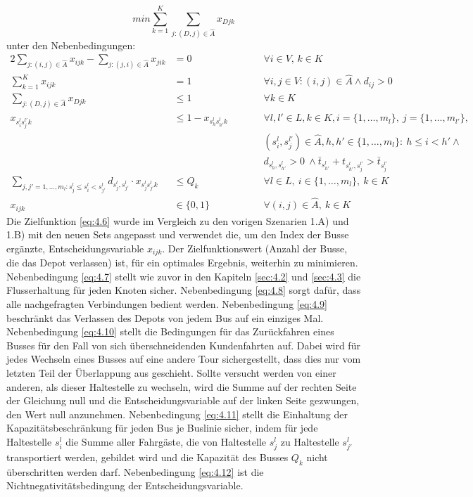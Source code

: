 \begin{equation}
    min \sum_{k=1}^{K} {\sum_{j:(D,j) \in \hat{A}} x_{Djk}}
\label{eq:4.6}
\end{equation}
unter den Nebenbedingungen:    
\begin{alignat}{2}
    \sum_{j:(i,j) \in \hat{A}} x_{ijk} - \sum_{j:(j,i) \in \hat{A}} x_{jik} &= 0
    &\qquad &\forall i \in V,\, k \in K \label{eq:4.7}\\
    \sum_{k=1}^{K} x_{ijk} &= 1
    &&\forall i,j \in V: (i,j) \in \hat{A} \wedge d_{ij} > 0 \label{eq:4.8}\\
    \sum_{j:(D,j) \in \hat{A}} x_{Djk}&\leq 1
    &&\forall k \in K \label{eq:4.9}\\
    x_{s_i^l s_j^{l'} k} &\leq 1 - x_{s_h^l s_{h'}^l k} 
    &&\forall l, l' \in L, k \in K, i=\{1,\dots,m_l\},\ j=\{1,\dots,m_{l'}\},\nonumber \\ 
    &&&(s_i^l, s_j^{l'}) \in \hat{A}, h, h' \in \{1,\dots,m_l\}:\ h \leq i < h'\wedge \nonumber\\
    &&& d_{s_h^l, s_{h'}^l} > 0 \ \wedge \bar{t}_{s_{h'}^l} + t_{s_{h'}^l, s_j^{l'}} > \bar{t}_{s_j^{l'}} \label{eq:4.10}\\
    \sum_{j,j' = 1,\dots,m_l: s_j^l \leq s_i^l < s_{j'}^l}
    d_{s_j^l, s_{j'}^l} \cdot x_{s_j^l s_{j'}^l k} &\leq Q_k 
    &&\forall l \in L,\ i \in \{1,\dots,m_l\},\ k \in K \label{eq:4.11}\\
    x_{ijk} &\in \{0,1\}
    &&\forall (i,j) \in \hat{A},\ k \in K \label{eq:4.12}
\end{alignat}
Die Zielfunktion \ref{eq:4.6} wurde im Vergleich zu den vorigen Szenarien 1.A) und 1.B) mit den neuen Sets angepasst und verwendet die, um den Index der Busse ergänzte, Entscheidungsvariable $x_{ijk}$. Der Zielfunktionswert (Anzahl der Busse, die das Depot verlassen) ist, für ein optimales Ergebnis, weiterhin zu minimieren. Nebenbedingung \ref{eq:4.7} stellt wie zuvor in den Kapiteln \ref{sec:4.2} und \ref{sec:4.3} die Flusserhaltung für jeden Knoten sicher. Nebenbedingung \ref{eq:4.8} sorgt dafür, dass alle nachgefragten Verbindungen bedient werden. Nebenbedingung \ref{eq:4.9} beschränkt das Verlassen des Depots von jedem Bus auf ein einziges Mal. Nebenbedingung \ref{eq:4.10} stellt die Bedingungen für das \glqq Zurückfahren\grqq{} eines Busses für den Fall von sich überschneidenden Kundenfahrten auf. Dabei wird für jedes Wechseln eines Busses auf eine andere Tour sichergestellt, dass dies nur vom letzten Teil der Überlappung aus geschieht. Sollte versucht werden von einer anderen, als dieser Haltestelle zu wechseln, wird die Summe auf der rechten Seite der Gleichung null und die Entscheidungsvariable auf der linken Seite gezwungen, den Wert null anzunehmen. Nebenbedingung \ref{eq:4.11} stellt die Einhaltung der Kapazitätsbeschränkung für jeden Bus je Buslinie sicher, indem für jede Haltestelle $s_i^l$ die Summe aller Fahrgäste, die von Haltestelle $s_j^l$ zu Haltestelle $s_{j'}^l$ transportiert werden, gebildet wird und die Kapazität des Busses $Q_k$ nicht überschritten werden darf. Nebenbedingung \ref{eq:4.12} ist die Nichtnegativitätsbedingung der Entscheidungsvariable.

